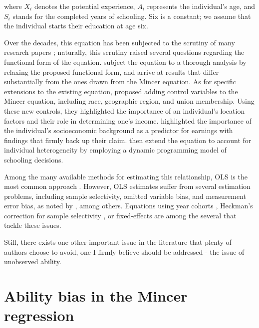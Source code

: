 where $X_i$ denotes the potential experience, $A_i$ represents the individual's age, and $S_i$ stands for the completed years of schooling. Six is a constant; we assume that the individual starts their education at age six.

Over the decades, this equation has been subjected to the scrutiny of many research papers \citep{ashenfelter1994estimates, heckman2006earnings, card1992does}; naturally, this scrutiny raised several questions regarding the functional form of the equation. 
\cite{heckman2003fifty} subject the equation to a thorough analysis by relaxing the proposed functional form, and arrive at results that differ substantially from the ones drawn from the Mincer equation. As for specific extensions to the existing equation, \cite{card1999causal} proposed adding control variables to the Mincer equation, including race, geographic region, and union membership. Using these new controls, they highlighted the importance of an individual's location factors and their role in determining one's income. \cite{psacharopoulos2004returns} highlighted the importance of the individual's socioeconomic background as a predictor for earnings with findings that firmly back up their claim. \cite{belzil2004earnings} then extend the equation to account for individual heterogeneity by employing a dynamic programming model of schooling decisions.

Among the many available methods for estimating this relationship, OLS is the most common approach \citep{ashenfelter1999review, card1999causal}. However, OLS estimates suffer from several estimation problems, including sample selectivity, omitted variable bias, and measurement error bias, as noted by \cite{aslam2007rates}, among others. Equations using year cohorts \citep{angrist2009mostly}, Heckman's correction for sample selectivity \citep{heckman1979sample}, or fixed-effects are among the several that tackle these issues.

Still, there exists one other important issue in the literature that plenty of authors choose to avoid, one I firmly believe should be addressed - the issue of unobserved ability.

\section{Ability bias in the Mincer regression}
\label{sec:ability_bias_and_mincer}

